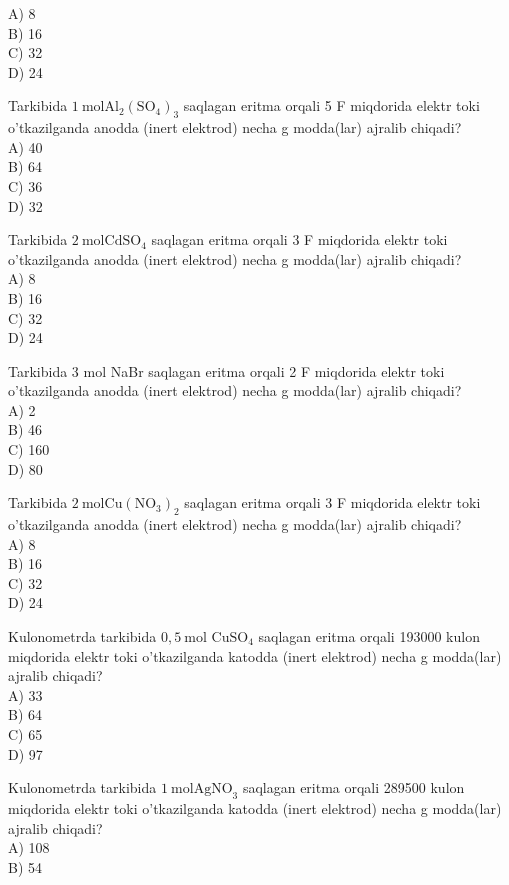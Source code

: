 A) 8\\
B) 16\\
C) 32\\
D) 24
  \item Tarkibida $1 \mathrm{~mol} \mathrm{Al}_{2}\left(\mathrm{SO}_{4}\right)_{3}$ saqlagan eritma orqali 5 F miqdorida elektr toki o'tkazilganda anodda (inert elektrod) necha g modda(lar) ajralib chiqadi?\\
A) 40\\
B) 64\\
C) 36\\
D) 32
  \item Tarkibida $2 \mathrm{~mol} \mathrm{CdSO}_{4}$ saqlagan eritma orqali 3 F miqdorida elektr toki o'tkazilganda anodda (inert elektrod) necha g modda(lar) ajralib chiqadi?\\
A) 8\\
B) 16\\
C) 32\\
D) 24
  \item Tarkibida 3 mol NaBr saqlagan eritma orqali 2 F miqdorida elektr toki o'tkazilganda anodda (inert elektrod) necha g modda(lar) ajralib chiqadi?\\
A) 2\\
B) 46\\
C) 160\\
D) 80
  \item Tarkibida $2 \mathrm{~mol} \mathrm{Cu}\left(\mathrm{NO}_{3}\right)_{2}$ saqlagan eritma orqali 3 F miqdorida elektr toki o'tkazilganda anodda (inert elektrod) necha g modda(lar) ajralib chiqadi?\\
A) 8\\
B) 16\\
C) 32\\
D) 24
  \item Kulonometrda tarkibida $0,5 \mathrm{~mol}$ $\mathrm{CuSO}_{4}$ saqlagan eritma orqali 193000 kulon miqdorida elektr toki o'tkazilganda katodda (inert elektrod) necha g modda(lar) ajralib chiqadi?\\
A) 33\\
B) 64\\
C) 65\\
D) 97
  \item Kulonometrda tarkibida $1 \mathrm{~mol} \mathrm{AgNO}_{3}$ saqlagan eritma orqali 289500 kulon miqdorida elektr toki o'tkazilganda katodda (inert elektrod) necha g modda(lar) ajralib chiqadi?\\
A) 108\\
B) 54\\
